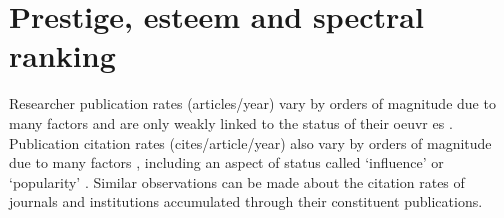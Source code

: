 \documentclass[10pt]{article}
\begin{document}
\section{Prestige, esteem and spectral ranking}
Researcher publication rates (articles/year) vary by orders of magnitude due to many factors and are only weakly linked to the status of their oeuvr%
%
es \citep{ScientificOutputRecognition, ioannidisEvolvingPatternsExtreme2024a}. Publication citation rates (cites/article/year) also vary by orders of magnitude due to many factors \citep{tahamtanFactorsAffectingNumber2016, tahamtanWhatCitationCounts2019}, including an aspect of status called `influence' or `popularity' \citep{bollenJournalStatus2006a, garfieldeugeneCitationIndexingIts1979}. Similar observations can be made about the citation rates of journals and institutions accumulated through their constituent publications.
\end{document}
